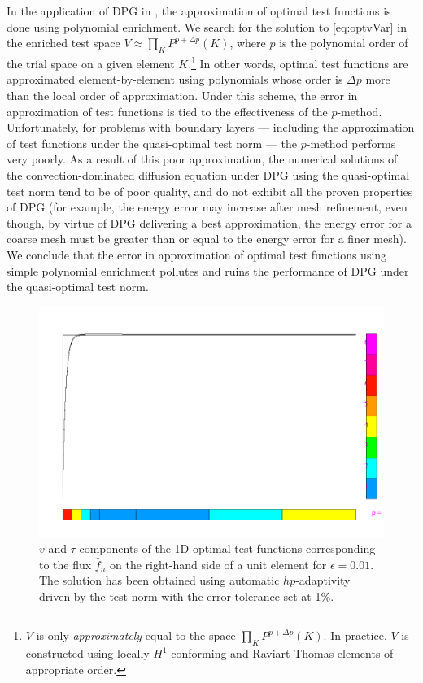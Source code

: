\documentclass[11pt,onecolumn]{scrartcl}
\newcommand{\eqnref}[1]{\eqref{eq:#1}}
\begin{document}
In the application of DPG in \cite{DPG1,DPG2,DPG3,DPG4}, the approximation of optimal test functions is done using polynomial enrichment. We search for the solution to \eqnref{optvVar} in the enriched test space $\tilde{V} \approx \prod_{K} P^{p+\Delta p}(K)$, where $p$ is the polynomial order of the trial space on a given element $K$.\footnote{$V$ is only \emph{approximately} equal to the space $\prod_{K} P^{p+\Delta p}(K)$. In practice, $V$ is constructed using locally $H^1$-conforming and Raviart-Thomas elements of appropriate order.}  In other words, optimal test functions are approximated element-by-element using polynomials whose order is $\Delta p$ more than the local order of approximation.  Under this scheme, the error in approximation of test functions is tied to the effectiveness of the $p$-method.  Unfortunately, for problems with boundary layers --- including the approximation of test functions under the quasi-optimal test norm --- the $p$-method performs very poorly. As a result of this poor approximation, the numerical solutions of the convection-dominated diffusion equation under DPG using the quasi-optimal test norm tend to be of poor quality, and do not exhibit all the proven properties of DPG (for example, the energy error may increase after mesh refinement, even though, by virtue of DPG delivering a best approximation, the energy error for a coarse mesh must be greater than or equal to the energy error for a finer mesh).  We conclude that the error in approximation of optimal test functions using simple polynomial enrichment pollutes and ruins the performance of DPG under the quasi-optimal test norm. 

\begin{figure}[!h]
\centering
\includegraphics[scale=.25]{figs/opt.png}
\caption{$v$ and $\tau$ components of the 1D optimal test functions corresponding to the flux $\widehat{f}_n$ on the right-hand side of a unit element for $\epsilon = 0.01$. The solution has been obtained using automatic $hp$-adaptivity driven by the test norm with the error tolerance set at 1\%.}
\label{fig:optTestBoundary}
\end{figure}
\end{document}
